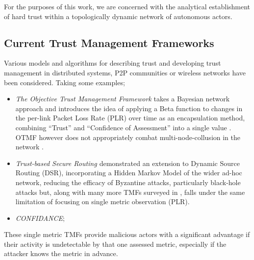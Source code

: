 \documentclass[runningheads,a4paper]{llncs}
\begin{document}
For the purposes of this work, we are concerned with the analytical establishment of hard trust within a topologically dynamic network of autonomous actors.

\subsection{Current Trust Management Frameworks}

Various models and algorithms for describing trust and developing trust management in distributed systems, P2P communities or wireless networks have been considered.
Taking some examples;

\begin{itemize}
  \item \emph{The Objective Trust Management Framework} takes a Bayesian network approach and introduces the idea of applying a Beta function to changes in the per-link Packet Loss Rate (PLR) over time as an encapsulation method, combining ``Trust'' and ``Confidence of Assessment'' into a single value \cite{Li2008}.
    OTMF however does not appropriately combat multi-node-collusion in the network \cite{Cho2011}.

  \item \emph{Trust-based Secure Routing \cite{Moe2008a}} demonstrated an extension to Dynamic Source Routing (DSR), incorporating a Hidden Markov Model of the wider ad-hoc network, reducing the efficacy of Byzantine attacks, particularly black-hole attacks but, along with many more TMFs surveyed in \cite{Cho2011}, falls under the same limitation of focusing on single metric observation (PLR).
  \item \emph{CONFIDANCE}; 
\end{itemize}

These single metric TMFs provide malicious actors with a significant advantage if their activity is undetectable by that one assessed metric, especially if the attacker knows the metric in advance.
\end{document}
